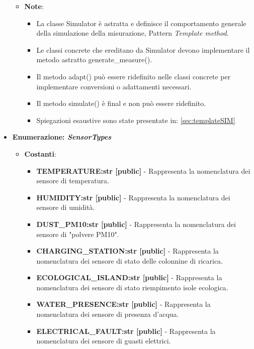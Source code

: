 \begin{itemize}
\begin{itemize}
\begin{itemize}
            \end{itemize}
            \item \textbf{Note}:
            \begin{itemize}
                \item La classe Simulator è astratta e definisce il comportamento generale della simulazione della misurazione, Pattern \textit{Template method}.
                \item Le classi concrete che ereditano da Simulator devono implementare il metodo astratto generate\_measure().
                \item Il metodo adapt() può essere ridefinito nelle classi concrete per implementare conversioni o adattamenti necessari.
                \item Il metodo simulate() è final e non può essere ridefinito.
                \item Spiegazioni esaustive sono state presentate in: \ref{sec:templateSIM}
            \end{itemize}
        \end{itemize}
        
        
        
        
        \item{\textbf{Enumerazione: \textit{SensorTypes}}}
        \begin{itemize}
            \item \textbf{Costanti}: 
            \begin{itemize}
                \item \textbf{TEMPERATURE:str [public]} - Rappresenta la nomenclatura dei sensore di temperatura.
                \item \textbf{HUMIDITY:str [public]} - Rappresenta la nomenclatura dei sensore di umidità.
                \item \textbf{DUST\_PM10:str [public]} - Rappresenta la nomenclatura dei sensore di "polvere PM10".
                \item \textbf{CHARGING\_STATION:str [public]} - Rappresenta la nomenclatura dei sensore di stato delle colonnine di ricarica.
                \item \textbf{ECOLOGICAL\_ISLAND:str [public]} - Rappresenta la nomenclatura dei sensore di stato riempimento isole ecologica.
                \item \textbf{WATER\_PRESENCE:str [public]} - Rappresenta la nomenclatura dei sensore di presenza d'acqua.
                \item \textbf{ELECTRICAL\_FAULT:str [public]} - Rappresenta la nomenclatura dei sensore di guasti elettrici.
            \end{itemize}


\end{itemize}
\end{itemize}
